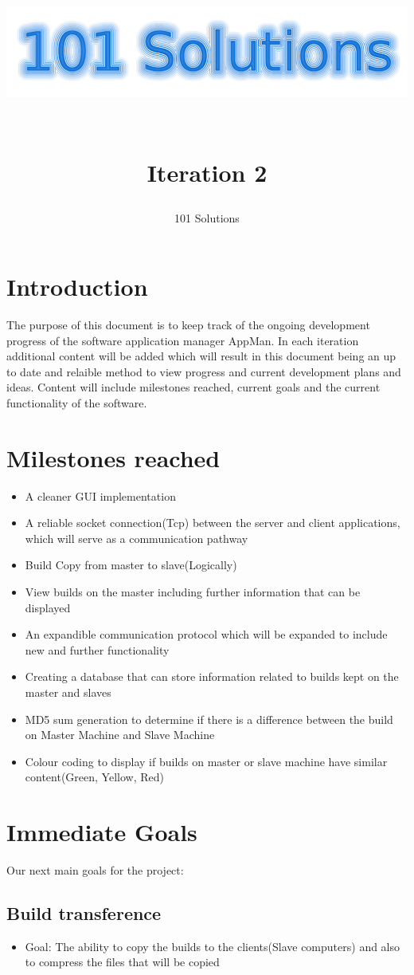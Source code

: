 \documentclass[a4paper,12pt,final]{article}
\title{
\begin{center}
  	\includegraphics[scale=0.3]{Logo.png} 
  \end{center}
  \textbf{\\}
Iteration 2\\
}
\author{101 Solutions}
\begin{document}
\maketitle
\thispagestyle{empty}
\newpage
\tableofcontents
\thispagestyle{empty}
\newpage
{}

\section{Introduction}
The purpose of this document is to keep track of the ongoing development progress of the software application manager AppMan.  In each iteration additional content will be added which will result in this document being an up to date and relaible method to view progress and current development plans and ideas. Content will include milestones reached, current goals and the current functionality of the software.

\section{Milestones reached}
\begin{itemize}
\item A cleaner GUI implementation
\item A reliable socket connection(Tcp) between the server and client applications, which will serve as a communication pathway
\item Build Copy from master to slave(Logically)
\item View builds on the master including further information that can be displayed
\item An expandible communication protocol which will be expanded to include new and further functionality
\item Creating a database that can store information related to builds kept on the master and slaves
\item MD5 sum generation to determine if there is a difference between the build on Master Machine and Slave Machine
\item Colour coding to display if builds on master or slave machine have similar content(Green, Yellow, Red)
\end{itemize}


\section{Immediate Goals}
Our next main goals for the project:
\subsection{Build transference}
\begin{itemize}
\item Goal: The ability to copy the builds to the clients(Slave computers) and also to compress the files that will be copied
\end{itemize}
\end{document}
